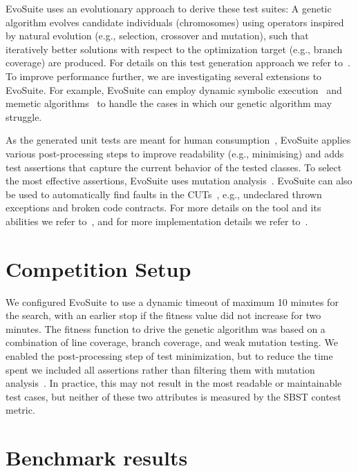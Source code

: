\documentclass[10pt,conference,compsocconf]{IEEEtran}
\newcommand{\EVOSUITE}{{\sc EvoSuite}\xspace}
\begin{document}
\EVOSUITE uses an evolutionary approach to derive these test suites: A
genetic algorithm evolves candidate individuals (chromosomes) using
operators inspired by natural evolution (e.g., selection, crossover
and mutation), such that iteratively better solutions with respect to
the optimization target (e.g., branch coverage) are produced.  For
details on this test generation approach we refer to~\cite{GoA_TSE12}.
To improve performance further, we are investigating several
extensions to \EVOSUITE. 
For example, \EVOSUITE can employ dynamic
symbolic execution~\cite{evoISSRE113} 
and memetic algorithms~\cite{fraser2014memetic}
to handle the cases in which our genetic algorithm may struggle. 


As the generated unit tests are meant for human
consumption~\cite{fraser2013does}, \EVOSUITE applies various
post-processing steps to improve readability (e.g., minimising) and
adds test assertions that capture the current behavior of the tested
classes. To select the most effective assertions, \EVOSUITE uses
mutation analysis~\cite{10.1109/TSE.2011.93}.  \EVOSUITE can also be
used to automatically find faults in the CUTs~\cite{emse13_oracle},
e.g., undeclared thrown exceptions and broken code contracts.  For
more details on the tool and its abilities we refer to~\cite{FrA11c},
and for more implementation details we refer to~\cite{FrA13a}.

\section{Competition Setup}

We configured \EVOSUITE to use a dynamic timeout of maximum 10 minutes
for the search, with an earlier stop if the fitness value did not
increase for two minutes. The fitness function to drive the genetic
algorithm was based on a combination of line coverage, branch
coverage, and weak mutation testing. We enabled the post-processing
step of test minimization, but to reduce the time spent we included
all assertions rather than filtering them with mutation
analysis~\cite{10.1109/TSE.2011.93}. In practice, this may not result
in the most readable or maintainable test cases, but neither of these
two attributes is measured by the SBST contest metric.

\section{Benchmark results}
\end{document}
